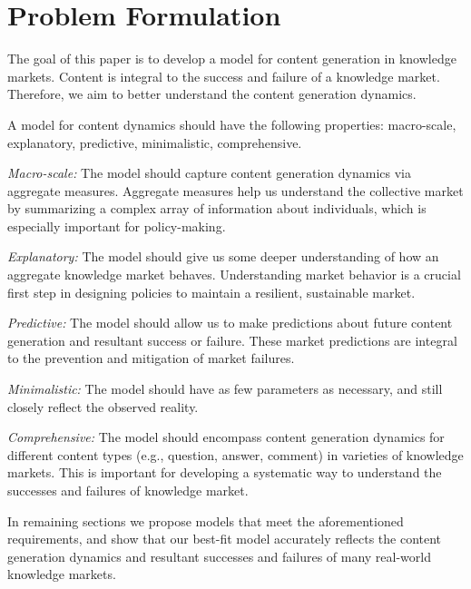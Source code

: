 \section{Problem Formulation} 
The goal of this paper is to develop a model for content generation in knowledge markets. Content is integral to the success and failure of a knowledge market. Therefore, we aim to better understand the content generation dynamics.

A model for content dynamics should have the following properties: macro-scale, explanatory, predictive, minimalistic, comprehensive.



\emph{Macro-scale:} The model should capture content generation dynamics via aggregate measures. Aggregate measures help us understand the collective market by summarizing a complex array of information about individuals, which is especially important for policy-making.

\emph{Explanatory:} The model should give us some deeper understanding of how an aggregate knowledge market behaves. Understanding market behavior is a crucial first step in designing policies to maintain a resilient, sustainable market.

\emph{Predictive:} The model should allow us to make predictions about future content generation and resultant success or failure. These market predictions are integral to the prevention and mitigation of market failures.

\emph{Minimalistic:} The model should have as few parameters as necessary, and still closely reflect the observed reality. %

\emph{Comprehensive:} The model should encompass content generation dynamics for different content types (e.g., question, answer, comment) in varieties of knowledge markets. This is important for developing a systematic way to understand the successes and failures of knowledge market.

In remaining sections we propose models that meet the aforementioned requirements, and show that our best-fit model accurately reflects the content generation dynamics and resultant successes and failures of many real-world knowledge markets.
